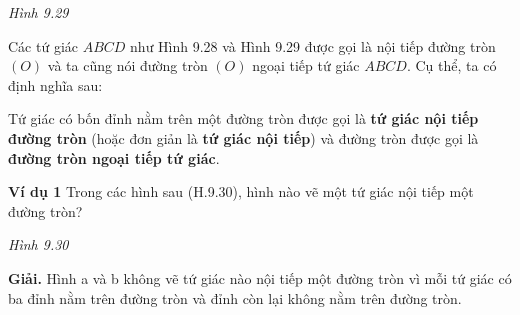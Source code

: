 \begin{lesson}
\begin{center}
        \textit{Hình 9.29}
    \end{center}

    \answerline

    Các tứ giác $ABCD$ như Hình 9.28 và Hình 9.29 được gọi là nội tiếp đường tròn $(O)$ và ta cũng nói đường tròn $(O)$ ngoại tiếp tứ giác $ABCD$. Cụ thể, ta có định nghĩa sau:

    \begin{keyconcept}
        Tứ giác có bốn đỉnh nằm trên một đường tròn được gọi là \textbf{tứ giác nội tiếp đường tròn} (hoặc đơn giản là \textbf{tứ giác nội tiếp}) và đường tròn được gọi là \textbf{đường tròn ngoại tiếp tứ giác}.
    \end{keyconcept}

    \textbf{Ví dụ 1} Trong các hình sau (H.9.30), hình nào vẽ một tứ giác nội tiếp một đường tròn?

    \begin{center}

        \textit{Hình 9.30}
    \end{center}

    \textbf{Giải.} Hình a và b không vẽ tứ giác nào nội tiếp một đường tròn vì mỗi tứ giác có ba đỉnh nằm trên đường tròn và đỉnh còn lại không nằm trên đường tròn.


\end{lesson}
